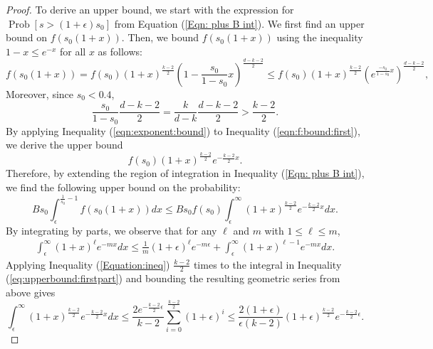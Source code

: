 \documentclass[twoside,11pt]{article}
\newcommand{\pP}[1]{\operatorname{Prob}\left[ #1 \right] }
\begin{document}
				\begin{proof}
				To derive an upper bound, we start with the expression for $\pP{s>(1+\epsilon)s_0}$ from Equation (\ref{Eqn: plus B int}).
				We first find an upper bound on $f(s_0(1+x))$. 
				Then, we bound $f(s_0(1+x))$ using the inequality $1-x\leq e^{-x}$ for all $x$				
				as follows:		
					\begin{equation}\label{eqn:f:bound:first}
						f(s_0(1+x))  = f(s_0) (1+x)^{\frac{k-2}{2}} \left( 1- \frac{s_0}{1-s_0}x\right)^{\frac{d-k-2}{2}}   
									 \leq f(s_0) (1+x)^{\frac{k-2}{2}} \left( e^{\frac{-s_0}{1-s_0}x}\right)^{\frac{d-k-2}{2}},
								\end{equation}
									 Moreover, since $s_0<0.4$, 
									 \begin{equation}\label{eqn:exponent:bound}
									 \frac{s_0}{1-s_0}\frac{d-k-2}{2}=\frac{k}{d-k}\frac{d-k-2}{2}>\frac{k-2}{2}.
									 \end{equation}	
									 By applying Inequality (\ref{eqn:exponent:bound}) to Inequality (\ref{eqn:f:bound:first}), 
									 we derive the upper bound
									\begin{equation*}
									f(s_0) (1+x)^{\frac{k-2}{2}} e^{-\frac{k-2}{2}x}.
						\end{equation*}
						Therefore, by extending the region of integration in Inequality (\ref{Eqn: plus B int}), we find the following upper bound on the probability:
						\begin{equation}\label{eq:upperbound:firstpart}
						Bs_0\int_\epsilon^{\frac{1}{s_0}-1}f(s_0(1+x))dx\leq Bs_0f(s_0)\int_\epsilon^\infty(1+x)^{\frac{k-2}{2}} e^{-\frac{k-2}{2}x}dx.
						\end{equation}				
				By integrating by parts, we observe that for any $\ell$ and $m$ with $1\leq\ell\leq m$,	
				\begin{align}
						\int_{\epsilon}^\infty (1+x)^{\ell} e^{-mx} dx  \leq \frac{1}{m}(1+\epsilon)^\ell e^{-m\epsilon} + \int_\epsilon^\infty (1+x)^{\ell-1} e^{-mx}dx. 
						\label{Equation:ineq}
					\end{align}
					Applying Inequality (\ref{Equation:ineq}) $\frac{k-2}{2}$ times to the integral in Inequality (\ref{eq:upperbound:firstpart}) and bounding the resulting geometric series from above  gives	
						$$
							\int_\epsilon^\infty (1+x)^{\frac{k-2}{2}} e^{-\frac{k-2}{2}x} dx   \leq \frac{2e^{-\frac{k-2}{2}\epsilon}}{k-2} \sum_{i=0}^{\frac{k-2}{2}}(1+\epsilon)^i\leq \frac{2(1+\epsilon)}{\epsilon(k-2)} (1+\epsilon)^{\frac{k-2}{2}} e^{-\frac{k-2}{2}\epsilon}.  
$$
\end{proof}
\end{document}
